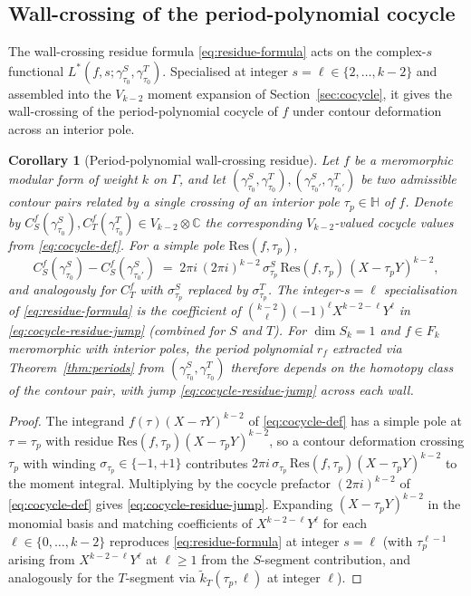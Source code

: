 \documentclass[11pt]{article}
\newtheorem{corollary}[theorem]{Corollary}
\numberwithin{equation}{section}  %
\newcommand{\HH}{\mathbb{H}}
\newcommand{\CC}{\mathbb{C}}
\begin{document}
\subsection{Wall-crossing of the period-polynomial cocycle}\label{subsec:period-wall-crossing}

The wall-crossing residue formula \eqref{eq:residue-formula} acts on
the complex-$s$ functional $L^*(f, s; \gamma^S_{\tau_0}, \gamma^T_{\tau_0})$.  
Specialised at integer $s = \ell \in \{2, \ldots,
k-2\}$ and assembled into the $V_{k-2}$ moment expansion of
Section~\ref{sec:cocycle}, it gives the wall-crossing of the
period-polynomial cocycle of $f$ under contour deformation across an
interior pole.

\begin{corollary}[Period-polynomial wall-crossing residue]\label{cor:period-wall-crossing}
Let $f$ be a meromorphic modular form of weight $k$ on $\Gamma$, and
let $(\gamma^S_{\tau_0}, \gamma^T_{\tau_0}), (\gamma^S_{\tau_0'},
\gamma^T_{\tau_0'})$ be two admissible contour pairs related by a
single crossing of an interior pole $\tau_p \in \HH$ of $f$.  Denote
by $C^f_S(\gamma^S_{\tau_0}), C^f_T(\gamma^T_{\tau_0}) \in V_{k-2}\otimes\CC$
the corresponding $V_{k-2}$-valued cocycle values from
\eqref{eq:cocycle-def}.  For a simple pole $\mathrm{Res}(f, \tau_p)$,
\begin{equation}\label{eq:cocycle-residue-jump}
  C^f_S(\gamma^S_{\tau_0}) - C^f_S(\gamma^S_{\tau_0'})
  \;=\; 2\pi i\,(2\pi i)^{k-2}\,\sigma^S_{\tau_p}\,
  \mathrm{Res}(f, \tau_p)\,(X - \tau_p Y)^{k-2},
\end{equation}
and analogously for $C^f_T$ with $\sigma^S_{\tau_p}$ replaced by
$\sigma^T_{\tau_p}$.  The integer-$s = \ell$ specialisation of
\eqref{eq:residue-formula} is the coefficient of
$\binom{k-2}{\ell}(-1)^\ell X^{k-2-\ell} Y^\ell$ in
\eqref{eq:cocycle-residue-jump} (combined for $S$ and $T$).  For
$\dim S_k = 1$ and $f \in F_k$ meromorphic with interior poles, the
period polynomial $r_f$ extracted via Theorem~\ref{thm:periods} from
$(\gamma^S_{\tau_0}, \gamma^T_{\tau_0})$ therefore depends on the
homotopy class of the contour pair, with jump
\eqref{eq:cocycle-residue-jump} across each wall.
\end{corollary}
\begin{proof}
The integrand $f(\tau)(X - \tau Y)^{k-2}$ of \eqref{eq:cocycle-def}
has a simple pole at $\tau = \tau_p$ with residue
$\mathrm{Res}(f, \tau_p)(X - \tau_p Y)^{k-2}$, so a contour deformation
crossing $\tau_p$ with winding $\sigma_{\tau_p} \in \{-1, +1\}$
contributes $2\pi i\,\sigma_{\tau_p}\,\mathrm{Res}(f, \tau_p)(X - \tau_p Y)^{k-2}$
to the moment integral.  Multiplying by the cocycle prefactor
$(2\pi i)^{k-2}$ of \eqref{eq:cocycle-def} gives
\eqref{eq:cocycle-residue-jump}.  Expanding $(X - \tau_p Y)^{k-2}$ in
the monomial basis and matching coefficients of $X^{k-2-\ell} Y^\ell$ for
each $\ell \in \{0, \ldots, k-2\}$ reproduces
\eqref{eq:residue-formula} at integer $s = \ell$ (with $\tau_p^{\ell-1}$
arising from $X^{k-2-\ell} Y^\ell$ at $\ell \ge 1$ from the $S$-segment
contribution, and analogously for the $T$-segment via
$\widetilde{k}_T(\tau_p, \ell)$ at integer $\ell$).
\end{proof}
\end{document}
